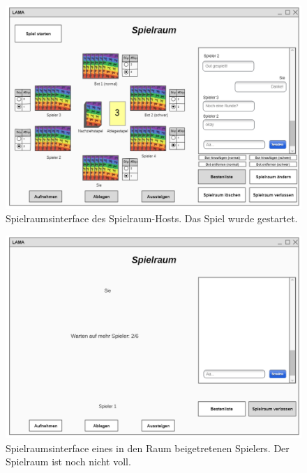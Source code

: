 \begin{figure}[h]
	\centering
	\includegraphics[width=\textwidth]{img/spielgestartet.png}
	\caption{Spielraumsinterface des Spielraum-Hosts. Das Spiel wurde gestartet.}
	\label{gui:spielraumgestartet_h} 
\end{figure}

\begin{figure}[h]
	\centering
	\includegraphics[width=\textwidth]{img/spielraumnichtvollbeigetretenerspielerv2.png}
	\caption{Spielraumsinterface eines in den Raum beigetretenen Spielers. Der Spielraum ist noch nicht voll.}
	\label{gui:spielraumnichtvoll_s} 
\end{figure}

